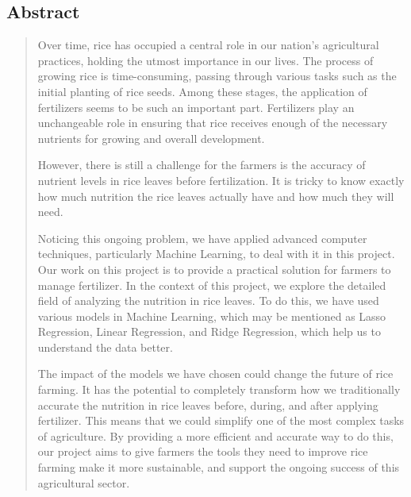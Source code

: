 \documentclass[
]{article}
\begin{document}
\hypertarget{section-4}{%
\subsection{}\label{section-4}}

\hypertarget{section-5}{%
\subsection{}\label{section-5}}

\hypertarget{section-6}{%
\subsection{}\label{section-6}}

\hypertarget{abstract}{%
\subsection{\texorpdfstring{\textbf{Abstract}}{Abstract}}\label{abstract}}

\begin{quote}
Over time, rice has occupied a central role in our nation's agricultural
practices, holding the utmost importance in our lives. The process of
growing rice is time-consuming, passing through various tasks such as
the initial planting of rice seeds. Among these stages, the application
of fertilizers seems to be such an important part. Fertilizers play an
unchangeable role in ensuring that rice receives enough of the necessary
nutrients for growing and overall development.

However, there is still a challenge for the farmers is the accuracy of
nutrient levels in rice leaves before fertilization. It is tricky to
know exactly how much nutrition the rice leaves actually have and how
much they will need.

Noticing this ongoing problem, we have applied advanced computer
techniques, particularly Machine Learning, to deal with it in this
project. Our work on this project is to provide a practical solution for
farmers to manage fertilizer. In the context of this project, we explore
the detailed field of analyzing the nutrition in rice leaves. To do
this, we have used various models in Machine Learning, which may be
mentioned as Lasso Regression, Linear Regression, and Ridge Regression,
which help us to understand the data better.

The impact of the models we have chosen could change the future of rice
farming. It has the potential to completely transform how we
traditionally accurate the nutrition in rice leaves before, during, and
after applying fertilizer. This means that we could simplify one of the
most complex tasks of agriculture. By providing a more efficient and
accurate way to do this, our project aims to give farmers the tools they
need to improve rice farming make it more sustainable, and support the
ongoing success of this agricultural sector.
\end{quote}
\end{document}
